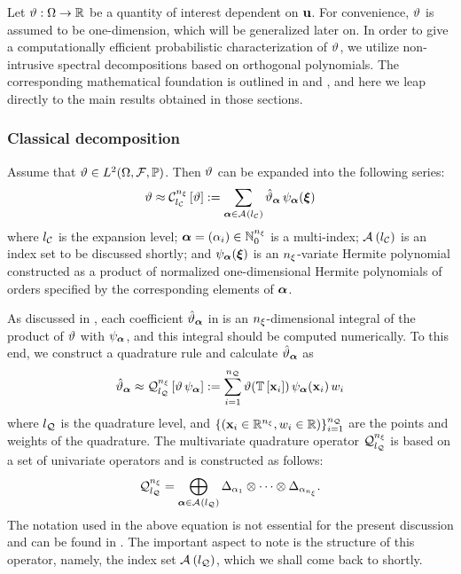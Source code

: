 Let $\vartheta: \Omega \to \mathbb{R}$ be a quantity of interest dependent on $\mathbf{u}$.
For convenience, $\vartheta$ is assumed to be one-dimension, which will be generalized later on.
In order to give a computationally efficient probabilistic characterization of $\vartheta$, we utilize non-intrusive spectral decompositions based on orthogonal polynomials.
The corresponding mathematical foundation is outlined in  and , and here we leap directly to the main results obtained in those sections.

\subsubsection{Classical decomposition} 
Assume that $\vartheta \in L^{2}(\Omega, \mathcal{F}, \mathbb{P})$.
Then $\vartheta$ can be expanded into the following series:
\begin{equation} \elab{spectral-decomposition}
  \w \approx \chaos{\nvars}{\nclevel}{\w} := \sum_{\multiindex \in \chaosMultiindexSet{\nclevel}} \coefficient{\w}_{\multiindex} \, \polynomial_{\multiindex}(\vz)
\end{equation}
where ${l_\mathcal{C}}$ is the expansion level; $\bm{\alpha} = (\alpha_i) \in \mathbb{N}_{0}^{n_\xi}$ is a multi-index; $\mathcal{A}_{}\left( {l_\mathcal{C}} \right)$ is an index set to be discussed shortly; and $\psi_{\bm{\alpha}}(\bm{\xi})$ is an ${n_\xi}$-variate Hermite polynomial constructed as a product of normalized one-dimensional Hermite polynomials of orders specified by the corresponding elements of $\bm{\alpha}$.

As discussed in , each coefficient $\hat{\vartheta}_{\bm{\alpha}}$ in  is an ${n_\xi}$-dimensional integral of the product of $\vartheta$ with $\psi_{\bm{\alpha}}$, and this integral should be computed numerically.
To this end, we construct a quadrature rule and calculate $\hat{\vartheta}_{\bm{\alpha}}$ as
\begin{equation} \elab{numerical-integration}
  \coefficient{\w}_{\multiindex} \approx \quadrature{\nvars}{\nqlevel}{\w \, \polynomial_{\multiindex}} := \sum_{i = 1}^\nqorder \w(\transformation{\point_i}) \, \polynomial_{\multiindex}(\point_i) \, \weight_i
\end{equation}
where ${l_\mathcal{Q}}$ is the quadrature level, and $\{ (\mathbf{x}_i \in \mathbb{R}^{n_\xi}, w_i \in \mathbb{R}) \}_{i = 1}^{n_\mathcal{Q}}$ are the points and weights of the quadrature.
The multivariate quadrature operator $\quadrature$ is based on a set of univariate operators and is constructed as follows:
\begin{equation} \elab{smolyak-sparse-grid}
  \quadrature = \bigoplus_{\multiindex \in \quadratureMultiindexSet{\nqlevel}} \Delta_{\alpha_1} \otimes \cdots \otimes \Delta_{\alpha_\nvars}.
\end{equation}
The notation used in the above equation is not essential for the present discussion and can be found in .
The important aspect to note is the structure of this operator, namely, the index set $\mathcal{A}_{}\left( {l_\mathcal{Q}} \right)$, which we shall come back to shortly.

